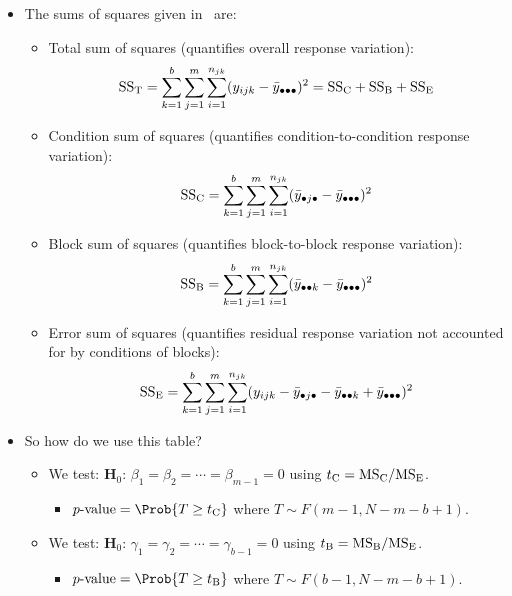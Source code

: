 \begin{itemize}
\begin{table}[!htbp]
\begin{NiceTabular}{|l|c|c|c|c|}
                  \midrule
                  Total     & $ \SST $ & $ N-1 $\\
                  \bottomrule
              \end{NiceTabular}
          \end{table}
    \item The sums of squares given in~ are:
          \begin{itemize}
              \item Total sum of squares (quantifies overall response variation):
                    \[ \text{SS}_{\text{T}}=\sum_{k=1}^{b} \sum_{j=1}^{m} \sum_{i=1}^{n_{jk}} (y_{ijk}-\bar{y}_{\bullet\bullet\bullet})^2=\text{SS}_{\text{C}}+\text{SS}_{\text{B}}+\text{SS}_{\text{E}} \]
              \item Condition sum of squares (quantifies condition-to-condition response variation):
                    \[ \text{SS}_{\text{C}}=\sum_{k=1}^{b} \sum_{j=1}^{m} \sum_{i=1}^{n_{jk}} (\bar{y}_{\bullet j\bullet}-\bar{y}_{\bullet\bullet\bullet})^2 \]
              \item Block sum of squares (quantifies block-to-block response variation):
                    \[ \text{SS}_{\text{B}}=\sum_{k=1}^{b} \sum_{j=1}^{m} \sum_{i=1}^{n_{jk}}(\bar{y}_{\bullet\bullet k}-\bar{y}_{\bullet\bullet\bullet})^2   \]
              \item Error sum of squares (quantifies residual response variation not accounted for by conditions of blocks):
                    \[ \text{SS}_{\text{E}}=\sum_{k=1}^{b} \sum_{j=1}^{m} \sum_{i=1}^{n_{jk}}(y_{ijk}-\bar{y}_{\bullet j\bullet}-\bar{y}_{\bullet\bullet k}+\bar{y}_{\bullet\bullet\bullet})^2   \]
          \end{itemize}
    \item So how do we use this table?
          \begin{itemize}
              \item We test: $ \mathbf{H}_0 $: $ \beta_1=\beta_2=\cdots=\beta_{m-1}=0 $ using $ t_\text{C}=\text{MS}_{\text{C}}/\text{MS}_{\text{E}} $.
                    \begin{itemize}
                        \item $ p\text{-value}=\Prob{T\ge t_\text{C}} $ where $ T \sim F(m-1,N-m-b+1) $.
                    \end{itemize}
              \item We test: $ \mathbf{H}_0 $: $ \gamma_1=\gamma_2=\cdots=\gamma_{b-1}=0 $ using $ t_\text{B}=\text{MS}_{\text{B}}/\text{MS}_{\text{E}} $.
                    \begin{itemize}
                        \item $ p\text{-value}=\Prob{T\ge t_\text{B}} $ where $ T \sim F(b-1,N-m-b+1) $.
                    \end{itemize}
          \end{itemize}
\end{itemize}
